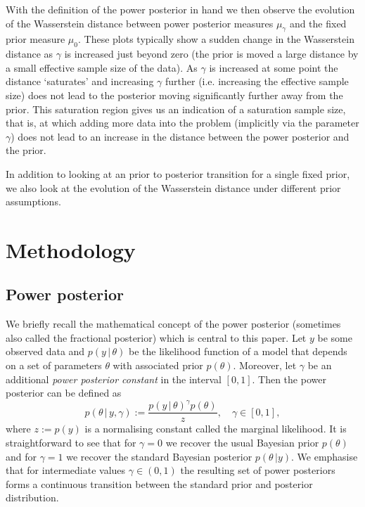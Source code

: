 \documentclass[12pt]{article}
\begin{document}
With the definition of the power posterior in hand we then observe the
evolution of the Wasserstein distance between power posterior measures
$\mu_{\gamma}$ and the fixed prior measure $\mu_{0}$. These plots typically
show a sudden change in the Wasserstein distance as $\gamma$ is increased just
beyond zero (the prior is moved a large distance by a small effective sample
size of the data). As $\gamma$ is increased at some point the distance
`saturates' and increasing $\gamma$ further (i.e. increasing the effective
sample size) does not lead to the posterior moving significantly further away
from the prior. This saturation region gives us an indication of a saturation
sample size, that is, at which adding more data into the problem (implicitly
via the parameter $\gamma$) does not lead to an increase in the distance
between the power posterior and the prior.

In addition to looking at an prior to posterior transition for a single fixed
prior, we also look at the evolution of the Wasserstein distance under
different prior assumptions.

\section{Methodology}

\subsection{Power posterior}
We briefly recall the mathematical concept of the power posterior (sometimes
also called the fractional posterior) which is central to this paper. Let $y$
be some observed data and $p(y\, | \, \theta)$ be the likelihood function of a
model that depends on a set of parameters $\theta$ with associated prior
$p(\theta)$. Moreover, let $\gamma$ be an additional \emph{power posterior
constant} in the interval $[0, 1]$. Then the power posterior
\citep{friel2008marginal} can be defined as
\begin{equation}
\label{eq:pow_pos}
p(\theta \, | \, y,\gamma) := \frac{p(y \, | \, \theta)^\gamma p(\theta)}{z}, \quad \gamma \in [0, 1],
\end{equation}
where $z := p(y)$ is a normalising constant called the marginal likelihood. It
is straightforward to see that for $\gamma = 0$ we recover the usual Bayesian
prior $p(\theta)$ and for $\gamma = 1$ we recover the standard Bayesian
posterior $p(\theta \, | y)$. We emphasise that for intermediate values $\gamma
\in (0, 1)$ the resulting set of power posteriors forms a continuous
transition between the standard prior and posterior distribution.
\end{document}
